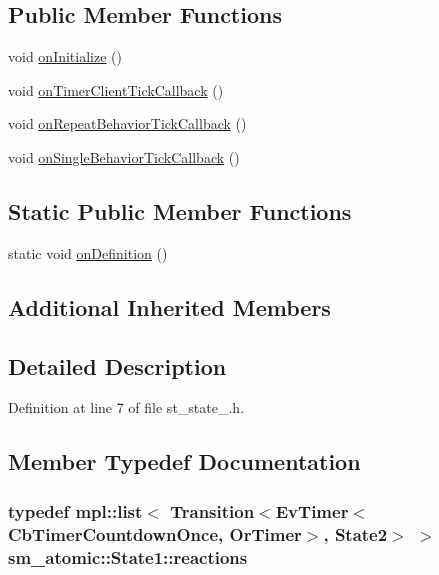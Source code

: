 \subsection*{Public Member Functions}
\begin{DoxyCompactItemize}
\item 
void \hyperlink{structsm__atomic_1_1State1_a13084492414b7b478f9f4b78a749c020}{on\+Initialize} ()
\item 
void \hyperlink{structsm__atomic_1_1State1_adea28f0a0fcedb210a29656f53aeee09}{on\+Timer\+Client\+Tick\+Callback} ()
\item 
void \hyperlink{structsm__atomic_1_1State1_a9d2c943f02a8e0f1d7b86132ada1c6e0}{on\+Repeat\+Behavior\+Tick\+Callback} ()
\item 
void \hyperlink{structsm__atomic_1_1State1_a9cb95d91cf5a22f0d9d079dc04bf58aa}{on\+Single\+Behavior\+Tick\+Callback} ()
\end{DoxyCompactItemize}
\subsection*{Static Public Member Functions}
\begin{DoxyCompactItemize}
\item 
static void \hyperlink{structsm__atomic_1_1State1_ad422837dc6136634e7fc8253658ec612}{on\+Definition} ()
\end{DoxyCompactItemize}
\subsection*{Additional Inherited Members}


\subsection{Detailed Description}


Definition at line 7 of file st\+\_\+state\+\_.\+h.



\subsection{Member Typedef Documentation}
\subsubsection[{\texorpdfstring{reactions}{reactions}}]{\setlength{\rightskip}{0pt plus 5cm}typedef mpl\+::list$<$ Transition$<${\bf Ev\+Timer}$<${\bf Cb\+Timer\+Countdown\+Once}, {\bf Or\+Timer}$>$, {\bf State2}$>$ $>$ {\bf sm\+\_\+atomic\+::\+State1\+::reactions}}\hypertarget{structsm__atomic_1_1State1_a38f44b3dfc4a7d81d4d2b7aca81171af}{}\label{structsm__atomic_1_1State1_a38f44b3dfc4a7d81d4d2b7aca81171af}


